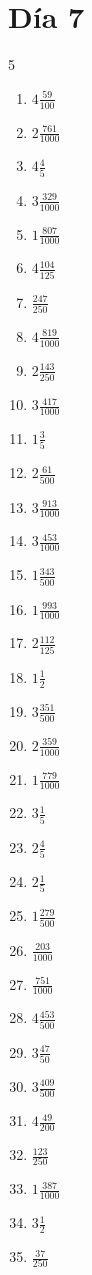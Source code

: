 \documentclass[12pt]{article}
\begin{document}
\section*{Día 7}
\begin{multicols}{5}\begin{enumerate}
\item $ 4 \frac{59}{100} $
\item $ 2 \frac{761}{1000} $
\item $ 4 \frac{4}{5} $
\item $ 3 \frac{329}{1000} $
\item $ 1 \frac{807}{1000} $
\item $ 4 \frac{104}{125} $
\item $ \frac{247}{250} $
\item $ 4 \frac{819}{1000} $
\item $ 2 \frac{143}{250} $
\item $ 3 \frac{417}{1000} $
\item $ 1 \frac{3}{5} $
\item $ 2 \frac{61}{500} $
\item $ 3 \frac{913}{1000} $
\item $ 3 \frac{453}{1000} $
\item $ 1 \frac{343}{500} $
\item $ 1 \frac{993}{1000} $
\item $ 2 \frac{112}{125} $
\item $ 1 \frac{1}{2} $
\item $ 3 \frac{351}{500} $
\item $ 2 \frac{359}{1000} $
\item $ 1 \frac{779}{1000} $
\item $ 3 \frac{1}{5} $
\item $ 2 \frac{4}{5} $
\item $ 2 \frac{1}{5} $
\item $ 1 \frac{279}{500} $
\item $ \frac{203}{1000} $
\item $ \frac{751}{1000} $
\item $ 4 \frac{453}{500} $
\item $ 3 \frac{47}{50} $
\item $ 3 \frac{409}{500} $
\item $ 4 \frac{49}{200} $
\item $ \frac{123}{250} $
\item $ 1 \frac{387}{1000} $
\item $ 3 \frac{1}{2} $
\item $ \frac{37}{250} $

\end{enumerate}
\end{multicols}
\end{document}
